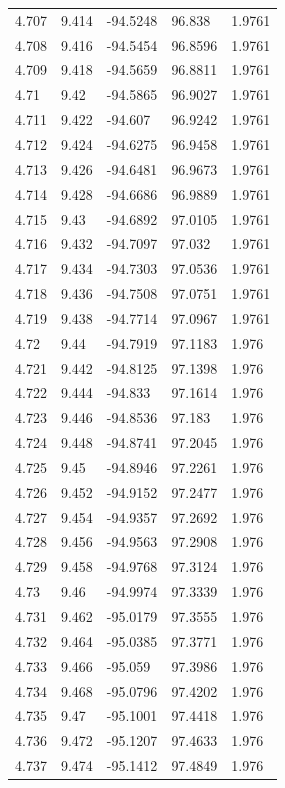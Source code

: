 \begin{tabular}{lllll}
4.707 & 9.414 & -94.5248 & 96.838 & 1.9761 \\
4.708 & 9.416 & -94.5454 & 96.8596 & 1.9761 \\
4.709 & 9.418 & -94.5659 & 96.8811 & 1.9761 \\
4.71 & 9.42 & -94.5865 & 96.9027 & 1.9761 \\
4.711 & 9.422 & -94.607 & 96.9242 & 1.9761 \\
4.712 & 9.424 & -94.6275 & 96.9458 & 1.9761 \\
4.713 & 9.426 & -94.6481 & 96.9673 & 1.9761 \\
4.714 & 9.428 & -94.6686 & 96.9889 & 1.9761 \\
4.715 & 9.43 & -94.6892 & 97.0105 & 1.9761 \\
4.716 & 9.432 & -94.7097 & 97.032 & 1.9761 \\
4.717 & 9.434 & -94.7303 & 97.0536 & 1.9761 \\
4.718 & 9.436 & -94.7508 & 97.0751 & 1.9761 \\
4.719 & 9.438 & -94.7714 & 97.0967 & 1.9761 \\
4.72 & 9.44 & -94.7919 & 97.1183 & 1.976 \\
4.721 & 9.442 & -94.8125 & 97.1398 & 1.976 \\
4.722 & 9.444 & -94.833 & 97.1614 & 1.976 \\
4.723 & 9.446 & -94.8536 & 97.183 & 1.976 \\
4.724 & 9.448 & -94.8741 & 97.2045 & 1.976 \\
4.725 & 9.45 & -94.8946 & 97.2261 & 1.976 \\
4.726 & 9.452 & -94.9152 & 97.2477 & 1.976 \\
4.727 & 9.454 & -94.9357 & 97.2692 & 1.976 \\
4.728 & 9.456 & -94.9563 & 97.2908 & 1.976 \\
4.729 & 9.458 & -94.9768 & 97.3124 & 1.976 \\
4.73 & 9.46 & -94.9974 & 97.3339 & 1.976 \\
4.731 & 9.462 & -95.0179 & 97.3555 & 1.976 \\
4.732 & 9.464 & -95.0385 & 97.3771 & 1.976 \\
4.733 & 9.466 & -95.059 & 97.3986 & 1.976 \\
4.734 & 9.468 & -95.0796 & 97.4202 & 1.976 \\
4.735 & 9.47 & -95.1001 & 97.4418 & 1.976 \\
4.736 & 9.472 & -95.1207 & 97.4633 & 1.976 \\
4.737 & 9.474 & -95.1412 & 97.4849 & 1.976 \\

\end{tabular}
